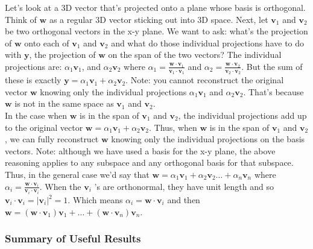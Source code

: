 \documentclass[main.tex]{subfiles}
\begin{document}
    Let's look at a 3D vector that's projected onto a plane whose basis is orthogonal. Think of $\mathbf{w}$ as a regular $3 \mathrm{D}$ vector sticking out into $3 \mathrm{D}$ space. Next, let $\mathbf{v}_{1}$ and $\mathbf{v}_{2}$ be two orthogonal vectors in the x-y plane. We want to ask: what's the projection of $\mathbf{w}$ onto each of $\mathbf{v}_{1}$ and $\mathbf{v}_{2}$ and what do those individual projections have to do with $\mathbf{y}$, the projection of $\mathbf{w}$ on the span of the two vectors? The individual projections are: $\alpha_{1} \mathbf{v}_{1}$, and $\alpha_{2} \mathbf{v}_{2}$ where $\alpha_{1}=\frac{\mathbf{w} \cdot \mathbf{v}_{1}}{\mathbf{v}_{1} \cdot \mathbf{v}_{1}}$ and $\alpha_{2}=\frac{\mathbf{w} \cdot \mathbf{v}_{2}}{\mathbf{v}_{2} \cdot \mathbf{v}_{2}}$. But the sum of these is exactly $\mathbf{y}=\alpha_{1} \mathbf{v}_{1}+\alpha_{2} \mathbf{v}_{2}$. Note: you cannot reconstruct the original vector $\mathbf{w}$ knowing only the individual projections $\alpha_{1} \mathbf{v}_{1}$ and $\alpha_{2} \mathbf{v}_{2}$. That's because $\mathbf{w}$ is not in the same space as $\mathbf{v}_{1}$ and $\mathbf{v}_{2}$.\\
    
    In the case when $\mathbf{w}$ is in the span of $\mathbf{v}_{1}$ and $\mathbf{v}_{2}$, the individual projections add up to the original vector $\mathbf{w}=\alpha_{1} \mathbf{v}_{1}+\alpha_{2} \mathbf{v}_{2}$. Thus, when $\mathbf{w}$ is in the span of $\mathbf{v}_{1}$ and $\mathbf{v}_{2}$, we can fully reconstruct $\mathbf{w}$ knowing only the individual projections on the basis vectors. Note: although we have used a basis for the x-y plane, the above reasoning applies to any subspace and any orthogonal basis for that subspace. Thus, in the general case we'd say that $\mathbf{w}=\alpha_{1} \mathbf{v}_{1}+\alpha_{2} \mathbf{v}_{2} \ldots+\alpha_{n} \mathbf{v}_{n}$ where $\alpha_{i}=\frac{\mathbf{w} \cdot \mathbf{v}_{i}}{\mathbf{v}_{i} \cdot \mathbf{v}_{i}}$. When the $\mathbf{v}_{i}$ 's are orthonormal, they have unit length and so $\mathbf{v}_{i} \cdot \mathbf{v}_{i}=\left|\mathbf{v}_{i}\right|^{2}=1$. Which means $\alpha_{i}=\mathbf{w} \cdot \mathbf{v}_{i}$ and then $\mathbf{w}=\left(\mathbf{w} \cdot \mathbf{v}_{1}\right) \mathbf{v}_{1}+\ldots+\left(\mathbf{w} \cdot \mathbf{v}_{n}\right) \mathbf{v}_{n}$.
    
    \subsubsection{Summary of Useful Results}
    
\end{document}
